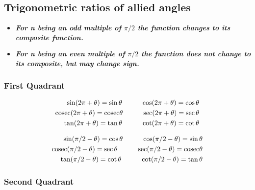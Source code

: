 \subsection{Trigonometric ratios of allied angles}
\begin{itemize}
    \item \textit{\textbf{For n being an odd multiple of $\pi/2$ the function changes to its composite function.}}
    \item \textit{\textbf{For n being an even multiple of $\pi/2$ the function does not change to its composite, but may change sign.}}
\end{itemize}

\subsubsection{First Quadrant}

\begin{align*}
\sin(2\pi + \theta) = \sin\theta \hspace{10mm} \cos(2\pi + \theta) = \cos\theta \\
\mathrm{cosec}(2\pi + \theta) = \mathrm{cosec}\theta \hspace{10mm} \sec(2\pi + \theta) = \sec\theta \\
\tan(2\pi + \theta) = \tan\theta \hspace{10mm} \cot(2\pi + \theta) = \cot\theta 
\end{align*}

\begin{align*}
\sin(\pi/2 - \theta) = \cos\theta \hspace{10mm} \cos(\pi/2 - \theta) = \sin\theta \\
\mathrm{cosec}(\pi/2 - \theta) = \sec\theta \hspace{10mm} \sec(\pi/2 - \theta) = \mathrm{cosec}\theta \\
\tan(\pi/2 - \theta) = \cot\theta \hspace{10mm} \cot(\pi/2 - \theta) = \tan\theta 
\end{align*}
\subsubsection{Second Quadrant}

